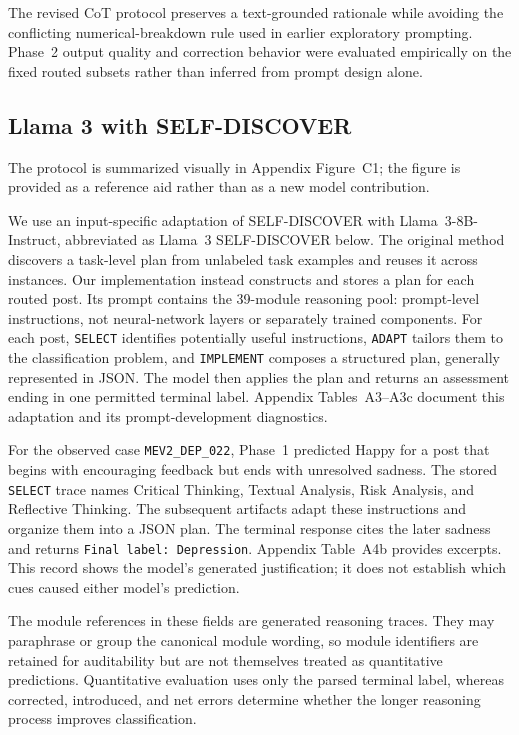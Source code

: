 \documentclass{ieeeaccess}
\begin{document}
The revised CoT protocol preserves a text-grounded rationale while avoiding the conflicting numerical-breakdown rule used in earlier exploratory prompting. Phase~2 output quality and correction behavior were evaluated empirically on the fixed routed subsets rather than inferred from prompt design alone.

\subsection{Llama 3 with SELF-DISCOVER}

The protocol is summarized visually in Appendix Figure~C1; the figure is provided as a reference aid rather than as a new model contribution.

We use an input-specific adaptation of SELF-DISCOVER \cite{ref18} with Llama~3-8B-Instruct, abbreviated as Llama~3 SELF-DISCOVER below. The original method discovers a task-level plan from unlabeled task examples and reuses it across instances. Our implementation instead constructs and stores a plan for each routed post. Its prompt contains the 39-module reasoning pool: prompt-level instructions, not neural-network layers or separately trained components. For each post, \texttt{SELECT} identifies potentially useful instructions, \texttt{ADAPT} tailors them to the classification problem, and \texttt{IMPLEMENT} composes a structured plan, generally represented in JSON. The model then applies the plan and returns an assessment ending in one permitted terminal label. Appendix Tables~A3--A3c document this adaptation and its prompt-development diagnostics.

For the observed case \texttt{MEV2\_DEP\_022}, Phase~1 predicted Happy for a post that begins with encouraging feedback but ends with unresolved sadness. The stored \texttt{SELECT} trace names Critical Thinking, Textual Analysis, Risk Analysis, and Reflective Thinking. The subsequent artifacts adapt these instructions and organize them into a JSON plan. The terminal response cites the later sadness and returns \texttt{Final label: Depression}. Appendix Table~A4b provides excerpts. This record shows the model's generated justification; it does not establish which cues caused either model's prediction.

The module references in these fields are generated reasoning traces. They may paraphrase or group the canonical module wording, so module identifiers are retained for auditability but are not themselves treated as quantitative predictions. Quantitative evaluation uses only the parsed terminal label, whereas corrected, introduced, and net errors determine whether the longer reasoning process improves classification.
\end{document}
